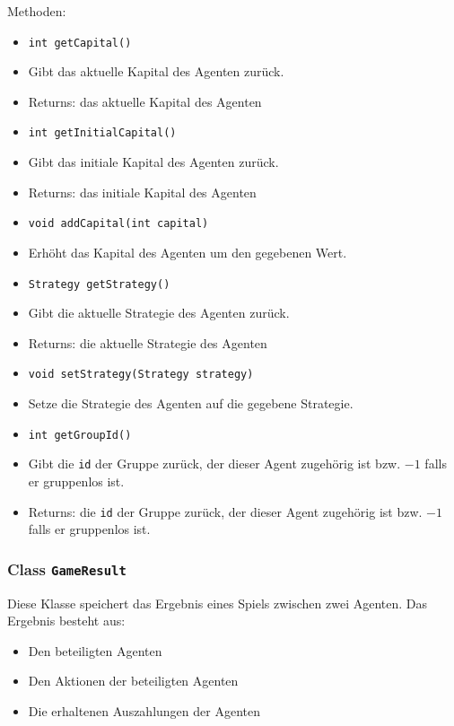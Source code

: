 \documentclass[parskip=full,11pt]{scrartcl}
\begin{document}
Methoden:
\begin{itemize}\itemsep -10pt
\item \texttt{int getCapital()}
\item[] Gibt das aktuelle Kapital des Agenten zurück.
\item[] Returns: das aktuelle Kapital des Agenten

\item \texttt{int getInitialCapital()}
\item[] Gibt das initiale Kapital des Agenten zurück.
\item[] Returns: das initiale Kapital des Agenten

\item \texttt{void addCapital(int capital)}
\item[] Erhöht das Kapital des Agenten um den gegebenen Wert.

\item \texttt{Strategy getStrategy()}
\item[] Gibt die aktuelle Strategie des Agenten zurück.
\item[] Returns: die aktuelle Strategie des Agenten

\item\texttt{void setStrategy(Strategy strategy)}
\item[] Setze die Strategie des Agenten auf die gegebene Strategie.

\item \texttt{int getGroupId()}
\item[] Gibt die \texttt{id} der Gruppe zurück, der dieser Agent zugehörig ist bzw. \(-1\) falls er gruppenlos ist.
\item[] Returns: die \texttt{id} der Gruppe zurück, der dieser Agent zugehörig ist bzw. \(-1\) falls er gruppenlos ist.
\end{itemize}

\subsubsection{Class \texttt{GameResult}}

Diese Klasse speichert das Ergebnis eines Spiels zwischen zwei Agenten. Das Ergebnis besteht aus:
\begin{itemize}\itemsep -10pt
	\item Den beteiligten Agenten
	\item Den Aktionen der beteiligten Agenten
	\item Die erhaltenen Auszahlungen der Agenten
\end{itemize}
	
\end{document}
